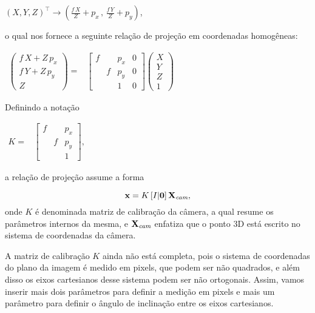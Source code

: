 \begin{center}
$(X,Y,Z)^\top \rightarrow (\frac{f\,X}{Z}+p_x\,,\,\frac{f\,Y}{Z}+p_y)$,
\end{center}
o qual nos fornece a seguinte relação de projeção em coordenadas homogêneas:

\begin{center}
$
\begin{array}{ccc}
\begin{pmatrix}
f\,X + Z\,p_x\\
f\,Y + Z\,p_y\\
Z
\end{pmatrix}=
&
\begin{bmatrix}
f& &p_x&0\\
 &f&p_y&0\\
 & &1&0
\end{bmatrix}
\begin{pmatrix}
X\\
Y\\
Z\\
1
\end{pmatrix}
\end{array}
$
\end{center}

Definindo a notação

\begin{center}
$
\begin{array}{cc}
K = & \begin{bmatrix}
      f& &p_x\\
       &f&p_y\\
       & &1
      \end{bmatrix}, 
\end{array}
$
\end{center}
a relação de projeção assume a forma


\begin{equation}\label{eq.camera-incompleta}
\mathbf{x}=K\,[I|{\bf 0}]\,\mathbf{X}_{\textit{cam}},
\end{equation}
onde $K$ é denominada matriz de calibração da câmera, a qual resume os parâmetros internos da mesma, e $\mathbf{X}_{\textit{cam}}$ enfatiza que o ponto 3D está escrito no sistema de coordenadas da câmera.

A matriz de calibração $K$ ainda não está completa, pois o sistema de coordenadas do plano da imagem é medido em pixels, que podem ser não quadrados, e além disso os eixos cartesianos desse sistema podem ser não ortogonais. Assim, vamos inserir mais dois parâmetros para definir a medição em pixels e mais um parâmetro para definir o ângulo de inclinação entre os eixos cartesianos.

